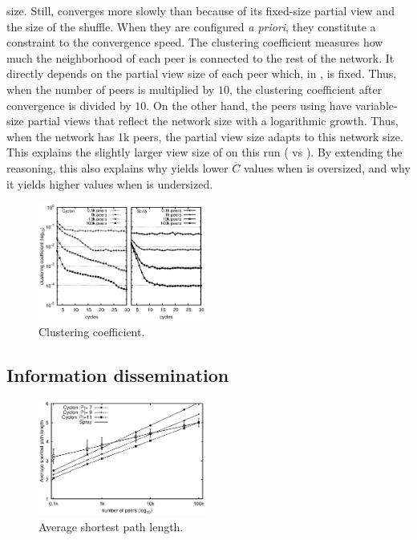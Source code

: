 \begin{asparadesc}
  size. Still, \CYCLON converges more slowly than \SPRAY because of
  its fixed-size partial view and the size of the shuffle. When they
  are configured \emph{a priori}, they constitute a constraint to the
  convergence speed.  The clustering coefficient measures how much the
  neighborhood of each peer is connected to the rest of the
  network. It directly depends on the partial view size of each peer
  which, in \CYCLON, is fixed. Thus, when the number of peers is
  multiplied by $10$, the clustering coefficient after convergence is
  divided by $10$. On the other hand, the peers using \SPRAY have
  variable-size partial views that reflect the network size with a
  logarithmic growth. Thus, when the network has 1k peers, the partial
  view size adapts to this network size. This explains the slightly
  larger view size of \SPRAY on this run ( vs ). By
  extending the reasoning, this also explains why \SPRAY yields lower
  $\overline{C}$ values when \CYCLON is oversized, and why it yields
  higher values when \CYCLON is undersized.
\end{asparadesc}

\begin{figure}
  \centering
  \includegraphics[width=0.49\textwidth]{img/simple.eps}
  \caption{\label{fig:clustering}Clustering coefficient.}
\end{figure}



\subsection{Information dissemination}

\begin{figure}
  \centering
  \includegraphics[width=0.49\textwidth]{img/avgpath.eps}
  \caption{\label{fig:avgpath}Average shortest path length.}
\end{figure}


